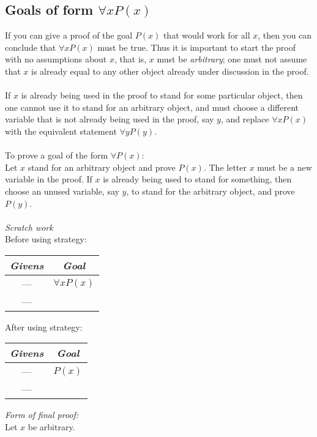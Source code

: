 \documentclass{report}
\theoremstyle{definition}
\begin{document}
\subsection{Goals of form $\forall xP(x)$}
If you can give a proof of the goal $P(x)$ that would work for all $x$, then you can conclude that $\forall xP(x)$ must
be true. Thus it is important to start the proof with
no assumptions about $x$, that is, $x$ must be \textit{arbitrary}; one must not assume that $x$ is already equal
to any other object already under discussion in the proof.\\
\vspace{1mm}\\
If $x$ is already being used in the proof to stand for
some particular object, then one cannot use it to stand for an
arbitrary object, and must choose a different variable that is not already being used in the proof, say $y$, and replace 
$\forall xP(x)$ with the equivalent statement $\forall yP(y)$.\\
\vspace{1mm}\\
\indent To prove a goal of the form  $\forall P(x)$:\\
\indent Let $x$ stand for an arbitrary object and prove $P(x)$. The letter $x$ must be a new variable in the proof. 
If $x$ is already being used to stand for something, then choose an unused variable, say $y$, to stand for the arbitrary 
object, and prove $P(y)$.\\
\vspace{1mm}\\
\textit{Scratch work}\\
Before using strategy:
\begin{center}
\begin{tabular}{c|c}
\textit{Givens}&\textit{Goal}\\
\hline
---&$\forall xP(x)$\\
---&
\end{tabular}
\end{center}
After using strategy:
\begin{center}
\begin{tabular}{c|c}
\textit{Givens}&\textit{Goal}\\
\hline
---&$P(x)$\\
---&
\end{tabular}
\end{center}
\textit{Form of final proof:}\\
\indent Let $x$ be arbitrary.\\
\end{document}

